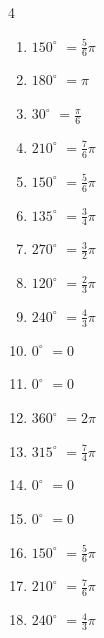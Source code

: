 \begin{multicols}{4}
\begin{enumerate}
  \item $\displaystyle 150^{\circ}$
        $\displaystyle =\frac{5}{6}\pi$

  \item $\displaystyle 180^{\circ}$
        $\displaystyle =\pi$

  \item $\displaystyle 30^{\circ}$
        $\displaystyle =\frac{\pi}{6}$

  \item $\displaystyle 210^{\circ}$
        $\displaystyle =\frac{7}{6}\pi$

  \item $\displaystyle 150^{\circ}$
        $\displaystyle =\frac{5}{6}\pi$

  \item $\displaystyle 135^{\circ}$
        $\displaystyle =\frac{3}{4}\pi$

  \item $\displaystyle 270^{\circ}$
        $\displaystyle =\frac{3}{2}\pi$

  \item $\displaystyle 120^{\circ}$
        $\displaystyle =\frac{2}{3}\pi$

  \item $\displaystyle 240^{\circ}$
        $\displaystyle =\frac{4}{3}\pi$

  \item $\displaystyle 0^{\circ}$
        $\displaystyle =0$

  \item $\displaystyle 0^{\circ}$
        $\displaystyle =0$

  \item $\displaystyle 360^{\circ}$
        $\displaystyle =2\pi$

  \item $\displaystyle 315^{\circ}$
        $\displaystyle =\frac{7}{4}\pi$

  \item $\displaystyle 0^{\circ}$
        $\displaystyle =0$

  \item $\displaystyle 0^{\circ}$
        $\displaystyle =0$

  \item $\displaystyle 150^{\circ}$
        $\displaystyle =\frac{5}{6}\pi$

  \item $\displaystyle 210^{\circ}$
        $\displaystyle =\frac{7}{6}\pi$

  \item $\displaystyle 240^{\circ}$
        $\displaystyle =\frac{4}{3}\pi$


\end{enumerate}
\end{multicols}
